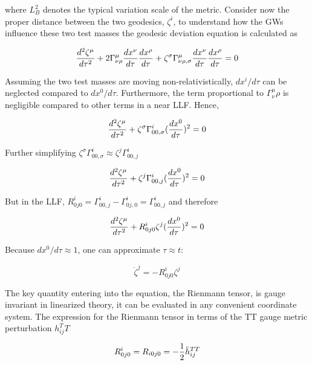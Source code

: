 \documentclass[binding=0.6cm, LaM]{sapthesis}
\begin{document}
	where $L^2_B$ denotes the typical variation scale of the metric.
	Consider now the proper distance between the two geodesics, $\zeta^i$, 
	to understand how the GWs influence these two test masses the geodesic deviation equation is calculated as

		\begin{equation}
		{{d^2\zeta^{\mu}}\over{d\tau^2}} + 2\Gamma^{\mu}_{\nu\rho}{{dx^{\nu}}\over{d\tau}}{{dx^\rho}\over{d\tau}} + \zeta^{\sigma}\Gamma^{\mu}_{\nu\rho,\sigma}{{dx^{\nu}}\over{d\tau}}{{dx^{\rho}}\over{d\tau}} = 0
		\end{equation}

	Assuming the two test masses are moving non-relativistically, $dx^i/d\tau$ can be neglected compared to $dx^0/d\tau$.
	Furthermore, the term proportional to $\Gamma^{\mu}_\nu\rho{}$ is negligible compared to other terms in a near LLF. Hence,

		\begin{equation}
		{{d^2\zeta^{\mu}}\over{d\tau^2}} + \zeta^{\sigma}\Gamma^{i}_{00, \sigma}({{dx^0}\over{d\tau}})^2 = 0
		\end{equation}

	Further simplifying $\zeta^{\sigma}\Gamma^{i}_{00, \sigma} \approx \zeta^{j}\Gamma^{i}_{00, j}$

		\begin{equation}
		{{d^2\zeta^{\mu}}\over{d\tau^2}} + \zeta^{j}\Gamma^{i}_{00,j}({{dx^0}\over{d\tau}})^2 = 0
		\end{equation}

	But in the LLF, $R^i_{0j0} = \Gamma^i_{00,j} - \Gamma^i_{0j,0} = \Gamma^i_{00,j}$ and therefore

		\begin{equation}
		{{d^2\zeta^{\mu}}\over{d\tau^2}} + R^i_{0j0} \zeta^j({{dx^0}\over{d\tau}})^2 = 0
		\end{equation}

	Because $dx^0/d\tau \approx 1$, one can approximate $\tau \approx t$:

		\begin{equation}
		{\ddot \zeta}^j = - R^i_{0j0}\zeta^j
		\end{equation}
	
	The key quantity entering into the equation, the Rienmann tensor, is gauge invariant in linearized theory, 
	it can be evaluated in any convenient coordinate system.
	The expression for the Rienmann tensor in terms of the TT gauge metric perturbation $h_{ij}^TT$

		\begin{equation}
		R^i_{0j0} = R_{i0j0} = - {1 \over 2}{\ddot h}_{ij}^{TT}
		\end{equation}
\end{document}
